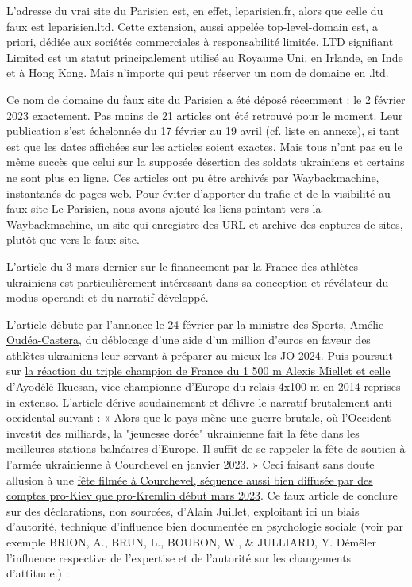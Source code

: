 \documentclass[a4paper]{article}
\begin{document}
L'adresse du vrai site du Parisien est, en effet, leparisien.fr, alors que celle du faux est leparisien.ltd. Cette extension, aussi appelée top-level-domain est, a priori, dédiée aux sociétés commerciales à responsabilité limitée. LTD signifiant Limited est un statut principalement utilisé au Royaume Uni, en Irlande, en Inde et à Hong Kong. Mais n'importe qui peut réserver un nom de domaine en .ltd.

Ce nom de domaine du faux site du Parisien a été déposé récemment : le 2 février 2023 exactement. Pas moins de 21 articles ont été retrouvé pour le moment. Leur publication s'est échelonnée du 17 février au 19 avril (cf. liste en annexe), si tant est que les dates affichées sur les articles soient exactes. Mais tous n'ont pas eu le même succès que celui sur la supposée désertion des soldats ukrainiens et certains ne sont plus en ligne. Ces articles ont pu être archivés par Waybackmachine, instantanés de pages web. Pour éviter d'apporter du trafic et de la visibilité au faux site Le Parisien, nous avons ajouté les liens pointant vers la Waybackmachine, un site qui enregistre des URL et archive des captures de sites, plutôt que vers le faux site.


L'article du 3 mars dernier sur le financement par la France des athlètes ukrainiens est particulièrement intéressant dans sa conception et révélateur du modus operandi et du narratif développé.

 L'article débute par \href{https://www.lequipe.fr/Athletisme/Actualites/La-france-promet-une-aide-d-un-million-d-euros-aux-athletes-ukrainiens-pour-les-jo-2024/1382521}{l'annonce le 24 février par la ministre des Sports, Amélie Oudéa-Castera,} du déblocage d'une aide d'un million d'euros en faveur des athlètes ukrainiens leur servant à préparer au mieux les JO 2024. Puis poursuit sur \href{https://www.lequipe.fr/Tous-sports/Actualites/L-aide-financiere-de-la-france-aux-sportifs-ukrainiens-mal-comprise-par-les-athletes-tricolores/1383462}{la réaction du triple champion de France du 1 500 m Alexis Miellet et celle d'Ayodélé Ikuesan}, vice-championne d'Europe du relais 4x100 m en 2014 reprises in extenso. L'article dérive soudainement et délivre le narratif brutalement anti-occidental suivant : « Alors que le pays mène une guerre brutale, où l'Occident investit des milliards, la "jeunesse dorée" ukrainienne fait la fête dans les meilleures stations balnéaires d'Europe. Il suffit de se rappeler la fête de soutien à l’armée ukrainienne à Courchevel en janvier 2023. » Ceci faisant sans doute allusion à une \href{https://www.tf1info.fr/international/video-guerre-ukraine-russie-des-jeunes-skieurs-francais-et-russes-a-courchevel-ont-ils-fete-la-mort-de-kiev-avec-un-cercueil-aux-couleurs-de-l-ukraine-2250135.html}{fête filmée à Courchevel, séquence aussi bien diffusée par des comptes pro-Kiev que pro-Kremlin début mars 2023}. Ce faux article de conclure sur des déclarations, non sourcées, d'Alain Juillet, exploitant ici un biais d’autorité, technique d’influence bien documentée en psychologie sociale (voir par exemple  BRION, A., BRUN, L., BOUBON, W., \& JULLIARD, Y. Démêler l’influence respective de l’expertise et de l’autorité sur les changements d’attitude.) :
\end{document}
